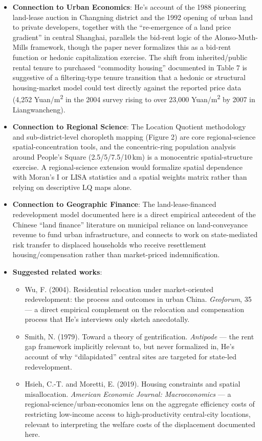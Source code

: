 \begin{itemize}
  \item \textbf{Connection to Urban Economics}: He's account of the 1988 pioneering land-lease auction in Changning district and the 1992 opening of urban land to private developers, together with the ``re-emergence of a land price gradient'' in central Shanghai, parallels the bid-rent logic of the Alonso-Muth-Mills framework, though the paper never formalizes this as a bid-rent function or hedonic capitalization exercise. The shift from inherited/public rental tenure to purchased ``commodity housing'' documented in Table 7 is suggestive of a filtering-type tenure transition that a hedonic or structural housing-market model could test directly against the reported price data (4,252 Yuan/m\textsuperscript{2} in the 2004 survey rising to over 23,000 Yuan/m\textsuperscript{2} by 2007 in Liangwancheng).
  \item \textbf{Connection to Regional Science}: The Location Quotient methodology and sub-district-level choropleth mapping (Figure 2) are core regional-science spatial-concentration tools, and the concentric-ring population analysis around People's Square (2.5/5/7.5/10\,km) is a monocentric spatial-structure exercise. A regional-science extension would formalize spatial dependence with Moran's I or LISA statistics and a spatial weights matrix rather than relying on descriptive LQ maps alone.
  \item \textbf{Connection to Geographic Finance}: The land-lease-financed redevelopment model documented here is a direct empirical antecedent of the Chinese ``land finance'' literature on municipal reliance on land-conveyance revenue to fund urban infrastructure, and connects to work on state-mediated risk transfer to displaced households who receive resettlement housing/compensation rather than market-priced indemnification.
  \item \textbf{Suggested related works}:
    \begin{itemize}
      \item Wu, F. (2004). Residential relocation under market-oriented redevelopment: the process and outcomes in urban China. \emph{Geoforum}, 35 --- a direct empirical complement on the relocation and compensation process that He's interviews only sketch anecdotally.
      \item Smith, N. (1979). Toward a theory of gentrification. \emph{Antipode} --- the rent gap framework implicitly relevant to, but never formalized in, He's account of why ``dilapidated'' central sites are targeted for state-led redevelopment.
      \item Hsieh, C.-T. and Moretti, E. (2019). Housing constraints and spatial misallocation. \emph{American Economic Journal: Macroeconomics} --- a regional-science/urban-economics lens on the aggregate efficiency costs of restricting low-income access to high-productivity central-city locations, relevant to interpreting the welfare costs of the displacement documented here.
    \end{itemize}
\end{itemize}

